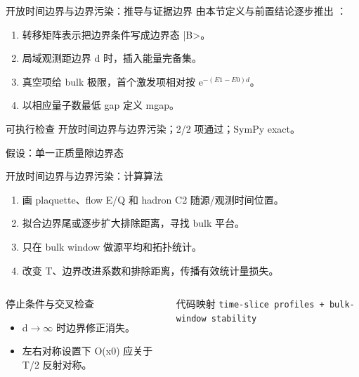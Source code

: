\begin{frame}[t]{开放时间边界与边界污染：推导与证据边界}
\footnotesize
{}\quad 由本节定义与前置结论逐步推出 ：
\begin{enumerate}
\item 转移矩阵表示把边界条件写成边界态 |B>。
\item 局域观测距边界 d 时，插入能量完备集。
\item 真空项给 bulk 极限，首个激发项相对按 e\ensuremath{^{-(E1-E0)d}}。
\item 以相应量子数最低 gap 定义 mgap。
\end{enumerate}\begin{block}{可执行检查}
\quad 开放时间边界与边界污染；2/2 项通过；SymPy exact。
\par\scriptsize 假设：单一正质量隙边界态
\end{block}
\end{frame}

\begin{frame}[t]{开放时间边界与边界污染：计算算法}
\footnotesize
{}\begin{enumerate}
\item 画 plaquette、flow E/\allowbreak{}Q 和 hadron C2 随源/\allowbreak{}观测时间位置。
\item 拟合边界尾或逐步扩大排除距离，寻找 bulk 平台。
\item 只在 bulk window 做源平均和拓扑统计。
\item 改变 T、边界改进系数和排除距离，传播有效统计量损失。
\end{enumerate}\begin{columns}[T,onlytextwidth]
\begin{block}{停止条件与交叉检查}\scriptsize\begin{itemize}
\item[\CheckMark] d\ensuremath{\rightarrow}\ensuremath{\infty} 时边界修正消失。
\item[\CheckMark] 左右对称设置下 O(x0) 应关于 T/\allowbreak{}2 反射对称。
\end{itemize}\end{block}
\begin{block}{代码映射}
\scriptsize \texttt{time-slice profiles + bulk-window stability}
\end{block}\end{columns}\end{frame}

